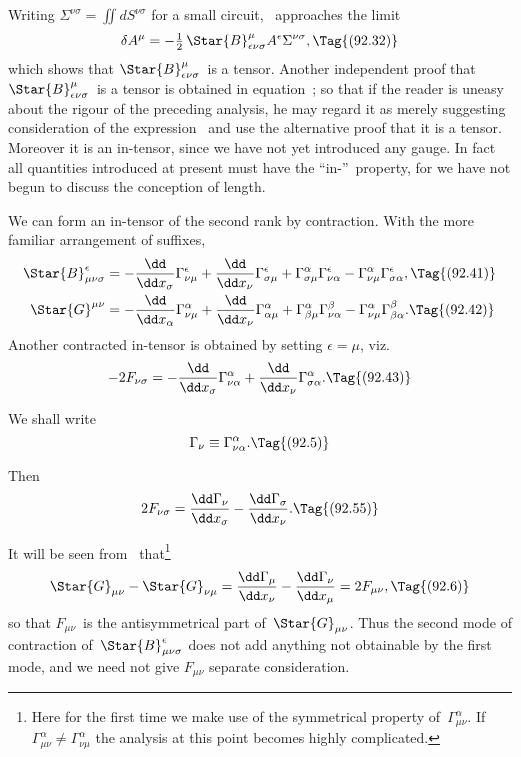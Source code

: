 \documentclass[12pt]{book}
\begin{document}
Writing $\Sigma^{\nu\sigma} = \iint dS^{\nu\sigma}$ for a small circuit, ~approaches the limit
\[
\delta A^{\mu} = -\tfrac{1}{2}\, \Star{B}_{\epsilon\nu\sigma}^{\mu} A^{\epsilon} \Sigma^{\nu\sigma},
\Tag{(92.32)}
\]
which shows that $\Star{B}_{\epsilon\nu\sigma}^{\mu}$~is a tensor\footnotemark.\footnotetext
  {Another independent proof that $\Star{B}_{\epsilon\nu\sigma}^{\mu}$~is a tensor is obtained in equation~; so that if
  the reader is uneasy about the rigour of the preceding analysis, he may regard it as merely
  suggesting consideration of the expression~ and use the alternative proof that it is a tensor.}
Moreover it is an in-tensor, since we have
not yet introduced any gauge. In fact all quantities introduced at present
must have the ``in-''~property, for we have not begun to discuss the conception
of length.

We can form an in-tensor of the second rank by contraction. With the
%
more familiar arrangement of suffixes,
\begin{align*}
  \Star{B}_{\mu\nu\sigma}^{\epsilon}
  &= -\frac{\dd}{\dd x_{\sigma}} \Gamma_{\nu\mu}^{\epsilon}
  + \frac{\dd}{\dd x_{\nu}} \Gamma_{\sigma\mu}^{\epsilon}
  + \Gamma_{\sigma\mu}^{\alpha} \Gamma_{\nu\alpha}^{\epsilon}
  - \Gamma_{\nu\mu}^{\alpha} \Gamma_{\sigma\alpha}^{\epsilon},
  \Tag{(92.41)} \\
  \Star{G}^{\mu\nu}
  &= -\frac{\dd}{\dd x_{\alpha}} \Gamma_{\nu\mu}^{\alpha}
  + \frac{\dd}{\dd x_{\nu}} \Gamma_{\alpha\mu}^{\alpha}
  + \Gamma_{\beta\mu}^{\alpha} \Gamma_{\nu\alpha}^{\beta}
  - \Gamma_{\nu\mu}^{\alpha} \Gamma_{\beta\alpha}^{\beta}.
  \Tag{(92.42)}
\end{align*}
Another contracted in-tensor is obtained by setting $\epsilon = \mu$, viz.\
\[
-2F_{\nu\sigma}
= -\frac{\dd}{\dd x_{\sigma}} \Gamma_{\nu\alpha}^{\alpha}
+ \frac{\dd}{\dd x_{\nu}} \Gamma_{\sigma\alpha}^{\alpha}.
\Tag{(92.43)}
\]

We shall write
\[
\Gamma_{\nu} \equiv \Gamma_{\nu\alpha}^{\alpha}.
\Tag{(92.5)}
\]

Then
\[
2F_{\nu\sigma}
= \frac{\dd\Gamma_{\nu}}{\dd x_{\sigma}} - \frac{\dd\Gamma_{\sigma}}{\dd x_{\nu}}.
\Tag{(92.55)}
\]

It will be seen from~ that\footnote
  {Here for the first time we make use of the symmetrical property of~$\Gamma_{\mu\nu}^{\alpha}$. If $\Gamma_{\mu\nu}^{\alpha} \neq \Gamma_{\nu\mu}^{\alpha}$ the
  analysis at this point becomes highly complicated.}
\[
\Star{G}_{\mu\nu} - \Star{G}_{\nu\mu}
= \frac{\dd\Gamma_{\mu}}{\dd x_{\nu}} - \frac{\dd\Gamma_{\nu}}{\dd x_{\mu}}
= 2F_{\mu\nu},
\Tag{(92.6)}
\]
so that $F_{\mu\nu}$~is the antisymmetrical part of~$\Star{G}_{\mu\nu}$. Thus the second mode of
contraction of~$\Star{B}_{\mu\nu\sigma}^{\epsilon}$ does not add anything not obtainable by the first mode,
and we need not give $F_{\mu\nu}$ separate consideration.
\end{document}
